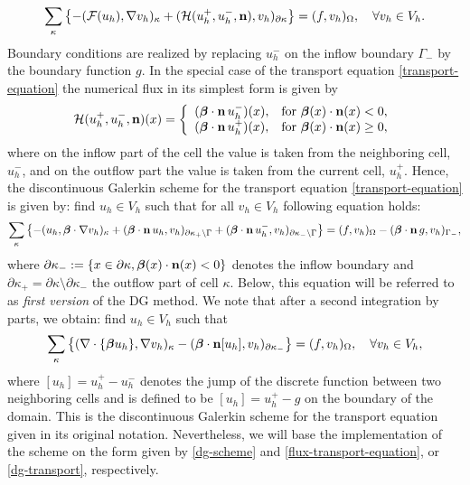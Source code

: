 \documentclass[11pt]{article}
\begin{document}
\begin{equation}\label{dg-scheme}
  \sum_\kappa\left\{-({\mathcal F}(u_h),\nabla v_h)_\kappa+({\mathcal H}(u_h^+,u_h^-,{\bf n}), v_h)_{\partial\kappa}\right\}=(f,v_h)_\Omega, \quad\forall v_h\in V_h.
\end{equation}
Boundary conditions are realized by replacing $u_h^-$ on the inflow boundary $\Gamma_-$ by the boundary function $g$.
In the special case of the transport equation
\eqref{transport-equation} the numerical flux in its simplest form
is given by
\begin{equation}\label{flux-transport-equation}
  {\mathcal H}(u_h^+,u_h^-,{\bf n})(x)=\left\{\begin{array}{ll}
      (\boldsymbol\beta\cdot{\bf n}\, u_h^-)(x),&\mbox{for } \boldsymbol\beta(x)\cdot{\bf n}(x)<0,\\
      (\boldsymbol\beta\cdot{\bf n}\, u_h^+)(x),&\mbox{for } \boldsymbol\beta(x)\cdot{\bf n}(x)\geq 0,
\end{array}
\right.
\end{equation}
where on the inflow part of the cell the value is taken from the
neighboring cell, $u_h^-$, and on the outflow part the value is
taken from the current cell, $u_h^+$.  Hence, the discontinuous Galerkin
scheme for the transport equation \eqref{transport-equation} is given
by: find $u_h\in V_h$ such that for all $v_h\in V_h$ following
equation holds:
\begin{equation}\label{dg-transport}
  \sum_\kappa\left\{-(u_h,\boldsymbol\beta\cdot\nabla v_h)_\kappa+(\boldsymbol\beta\cdot{\bf n}\, u_h, v_h)_{\partial\kappa_+\setminus\Gamma}+(\boldsymbol\beta\cdot{\bf n}\, u_h^-, v_h)_{\partial\kappa_-\setminus\Gamma}\right\}=(f,v_h)_\Omega-(\boldsymbol\beta\cdot{\bf n}\, g, v_h)_{\Gamma_-},
\end{equation}
where $\partial\kappa_-:=\{x\in\partial\kappa,
\boldsymbol\beta(x)\cdot{\bf n}(x)<0\}$ denotes the inflow boundary
and $\partial\kappa_+=\partial\kappa\setminus \partial \kappa_-$ the
outflow part of cell $\kappa$. Below, this equation will be referred
to as \emph{first version} of the DG method. We note that after a
second integration by parts, we obtain: find $u_h\in V_h$ such that
\[
  \sum_\kappa\left\{(\nabla\cdot\{\boldsymbol\beta u_h\},\nabla v_h)_\kappa-(\boldsymbol\beta\cdot{\bf n} [u_h], v_h)_{\partial\kappa_-}\right\}=(f,v_h)_\Omega, \quad\forall v_h\in V_h,
\]
where $[u_h]=u_h^+-u_h^-$ denotes the jump of the discrete function
between two neighboring cells and is defined to be $[u_h]=u_h^+-g$ on
the boundary of the domain. This is the discontinuous Galerkin scheme
for the transport equation given in its original notation.
Nevertheless, we will base the implementation of the scheme on the
form given by \eqref{dg-scheme} and \eqref{flux-transport-equation},
or \eqref{dg-transport}, respectively.
\end{document}
